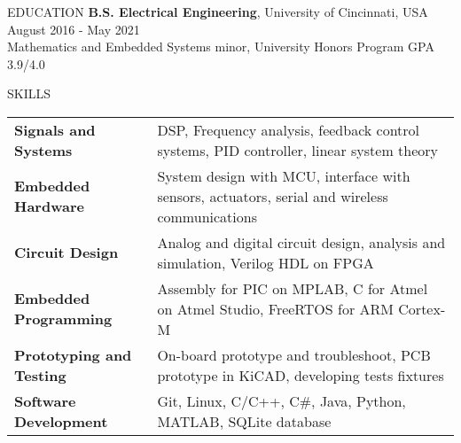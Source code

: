 \documentclass{../lib/resume} %
\begin{document}

    \begin{rSection}{EDUCATION}
        {\bf B.S. Electrical Engineering}, University of Cincinnati, USA \hfill {August 2016 - May 2021}\\
        Mathematics and Embedded Systems minor, University Honors Program \hfill {GPA 3.9/4.0}




    \end{rSection}

    \begin{rSection}{SKILLS}

        \begin{tabular}{ @{} >{\bfseries}l @{\hspace{2ex}} l }
            Signals and Systems & DSP, Frequency analysis, feedback control systems, PID controller, linear system theory	\\
            Embedded Hardware & System design with MCU, interface with sensors, actuators, serial and wireless communications \\
            Circuit Design & Analog and digital circuit design, analysis and simulation, Verilog HDL on FPGA \\
            Embedded Programming & Assembly for PIC on MPLAB, C for Atmel on Atmel Studio, FreeRTOS for ARM Cortex-M \\
            Prototyping and Testing &  On-board prototype and troubleshoot, PCB prototype in KiCAD, developing tests fixtures \\
            Software Development & Git, Linux, C/C++, C\#, Java, Python, MATLAB, SQLite database \\
        \end{tabular}
    \end{rSection}
\end{document}
